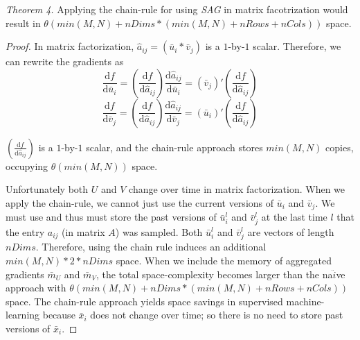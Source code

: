 \emph{Theorem 4.} 
Applying the chain-rule for using \emph{SAG} in matrix facotrization would result in $\theta(min(M,N) + nDims*(min(M,N)+nRows+nCols))$ space.
\begin{proof}
In matrix factorization, $\hat{a}_{ij} = \left(\bar{u}_{i}*\bar{v}_{j}\right)$ is a $1$-by-$1$ scalar.  
Therefore, we can rewrite the gradients as
\begin{equation}
\frac{\text{d}{f}}{\text{d}\bar{u}_{i}} = \left(\frac{\text{d}{f}}{\text{d}\hat{a}_{ij}}\right)\frac{\text{d}{\hat{a}_{ij}}}{\text{d}\bar{u}_{i}} = \left(\bar{v}_{j}\right)'\left(\frac{\text{d}{f}}{\text{d}\hat{a}_{ij}}\right)
\end{equation}
\begin{equation}
\frac{\text{d}{f}}{\text{d}\bar{v}_{j}} = \left(\frac{\text{d}{f}}{\text{d}\hat{a}_{ij}}\right)\frac{\text{d}{\hat{a}_{ij}}}{\text{d}\bar{v}_{j}} = \left(\bar{u}_{i}\right)'\left(\frac{\text{d}{f}}{\text{d}\hat{a}_{ij}}\right)
\end{equation}

$\left(\frac{\text{d}{f}}{\text{d}\hat{a}_{ij}}\right)$ is a $1$-by-$1$ scalar, and the chain-rule approach stores $min(M,N)$ copies, occupying $\theta(min(M,N))$ space.

Unfortunately both $U$ and $V$ change over time in matrix factorization.
When we apply the chain-rule, we cannot just use the current versions of $\bar{u}_{i}$ and $\bar{v}_{j}$.
We must use and thus must store the past versions of $\bar{u}_{i}^{l}$ and $\bar{v}_{j}^{l}$ at the last time $l$ that the entry $a_{ij}$ (in matrix $A$) was sampled.
Both $\bar{u}_{i}^{l}$ and $\bar{v}_{j}^{l}$ are vectors of length $nDims$.
Therefore, using the chain rule induces an additional $min(M,N)*2*nDims$ space.
When we include the memory of aggregated gradients $\bar{m}_{U}$ and $\bar{m}_{V}$, the total space-complexity becomes larger than the na$\ddot{i}$ve approach with $\theta(min(M,N) + nDims*(min(M,N)+nRows+nCols))$ space.
The chain-rule approach yields space savings in supervised machine-learning because $\bar{x}_{i}$ does not change over time; 
so there is no need to store past versions of $\bar{x}_{i}$.
\end{proof}
